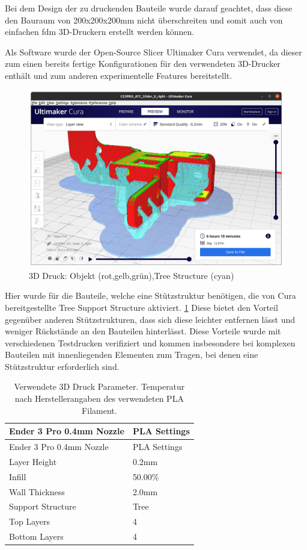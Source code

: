 Bei dem Design der zu druckenden Bauteile wurde darauf geachtet, dass
diese den Bauraum von 200x200x200mm nicht überschreiten und somit auch
von einfachen \gls{fdm} 3D-Druckern erstellt werden können.

Als Software wurde der Open-Source Slicer Ultimaker Cura
\cite{ultimakercura} verwendet, da dieser zum einen bereits fertige
Konfigurationen für den verwendeten 3D-Drucker enthält und zum anderen
experimentelle Features bereitstellt.

\begin{figure}
\centering
\includegraphics{images/3d_print_tree_structure.png}
\caption{3D Druck: Objekt (rot,gelb,grün),Tree Structure (cyan)
\label{3d_print_tree_structure}}
\end{figure}

Hier wurde für die Bauteile, welche eine Stützstruktur benötigen, die
von Cura bereitgestellte Tree Support Structure aktiviert.
\ref{3d_print_tree_structure} Diese bietet den Vorteil gegenüber anderen
Stützstrukturen, dass sich diese leichter entfernen lässt und weniger
Rückstände an den Bauteilen hinterlässt. Diese Vorteile wurde mit
verschiedenen Testdrucken verifiziert und kommen insbesondere bei
komplexen Bauteilen mit innenliegenden Elementen zum Tragen, bei denen
eine Stützstruktur erforderlich sind.

\begin{longtable}[]{@{}ll@{}}
\caption{Verwendete 3D Druck Parameter. Temperatur nach
Herstellerangaben des verwendeten PLA Filament.}\tabularnewline
\toprule
Ender 3 Pro 0.4mm Nozzle & PLA Settings\tabularnewline
\midrule
\endfirsthead
\toprule
Ender 3 Pro 0.4mm Nozzle & PLA Settings\tabularnewline
\midrule
\endhead
Layer Height & 0.2mm\tabularnewline
Infill & 50.00\%\tabularnewline
Wall Thickness & 2.0mm\tabularnewline
Support Structure & Tree\tabularnewline
Top Layers & 4\tabularnewline
Bottom Layers & 4\tabularnewline
\bottomrule
\end{longtable}

